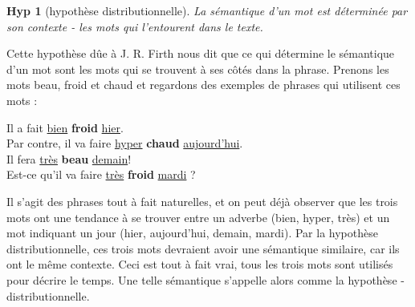 \documentclass[11pt, a4paper]{report}
\newtheorem{hyp}{Hyp}[section]
\begin{document}
\begin{hyp}[hypothèse distributionnelle]
  La sémantique d'un mot est déterminée par son contexte - les mots qui l'entourent dans 
  le texte. 
\end{hyp}

Cette hypothèse dûe à J. R. Firth nous dit que ce qui détermine le sémantique d'un mot 
sont les mots qui se trouvent à ses côtés dans la phrase. Prenons les mots 
beau, froid et chaud et regardons des exemples de 
phrases qui utilisent ces mots : 

\begin{center}
  Il a fait \underline{bien} \textbf{froid} \underline{hier}. \\
  Par contre, il va faire \underline{hyper} \textbf{chaud} \underline{aujourd'hui}. \\
  Il fera \underline{très} \textbf{beau} \underline{demain}! \\
  Est-ce qu'il va faire \underline{très} \textbf{froid} \underline{mardi} ?
\end{center}

Il s'agit des phrases tout à fait naturelles, et on peut déjà observer que les trois mots 
ont une tendance à se trouver entre un adverbe (bien, hyper, très) et un mot indiquant 
un jour (hier, aujourd'hui, demain, mardi). Par la hypothèse distributionnelle, ces trois mots 
devraient avoir une sémantique similaire, car ils ont le même 
contexte. Ceci est tout à fait vrai, tous les trois mots sont utilisés pour décrire le temps. 
Une telle sémantique s'appelle alors comme la hypothèse - distributionnelle. 
\end{document}

